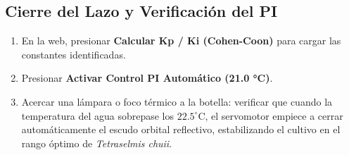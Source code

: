 \documentclass[11pt,letterpaper]{article}
\begin{document}
\subsection{Cierre del Lazo y Verificación del PI}
\begin{enumerate}
    \item En la web, presionar \textbf{Calcular Kp / Ki (Cohen-Coon)} para cargar las constantes identificadas.
    \item Presionar \textbf{Activar Control PI Automático (21.0 °C)}.
    \item Acercar una lámpara o foco térmico a la botella: verificar que cuando la temperatura del agua sobrepase los $22.5^\circ\text{C}$, el servomotor empiece a cerrar automáticamente el escudo orbital reflectivo, estabilizando el cultivo en el rango óptimo de \textit{Tetraselmis chuii}.
\end{enumerate}
\end{document}
